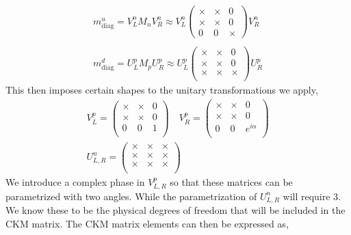\begin{equation}
\begin{split}
m^u_{\text{diag}} = V_L^n M_n V_R^n \approx V_L^n \begin{pmatrix}
\times & \times & 0 \\
\times & \times & 0 \\
0 & 0 & \times 
\end{pmatrix}  V_R^n  \\
\\ 
m^d_{\text{diag}} = U_L^p  M_p U_R^p \approx U_L^p \begin{pmatrix}
\times & \times & 0 \\
\times & \times & 0 \\
\times & \times & \times \\ \end{pmatrix} U_R^p 
\end{split} 
\end{equation}
This then imposes certain shapes to the unitary transformations we apply,
\begin{equation}
\begin{gathered}
V^{p}_{L} = \begin{pmatrix}
\times & \times & 0 \\ 
\times & \times & 0 \\
0 & 0 & 1 \\ 
\end{pmatrix} \quad  V^{p}_{R} = \begin{pmatrix}
\times & \times & 0 \\ 
\times & \times & 0 \\
0 & 0 & e^{i\alpha}  \\ 
\end{pmatrix}  \\ 
U^{n}_{L,R} = 
\begin{pmatrix}
\times & \times & \times \\ 
\times & \times & \times \\
\times & \times & \times \\
\end{pmatrix}
\end{gathered} 
\end{equation}
We introduce a complex phase in $V^p_{L,R}$ so that these matrices can be parametrized with two angles. While the parametrization of $U^n_{L,R}$ will require 3. We know these to be the physical degrees of freedom that will be included in the CKM matrix. The CKM matrix elements can then be expressed as, 
